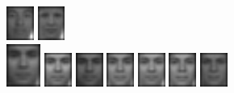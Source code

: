 \begin{figure}[hbt]
  \includegraphics[width=0.08\textwidth]{../results/L_rez/incorrect90/1/9.jpg}
  \includegraphics[width=0.08\textwidth]{../results/L_rez/incorrect90/1/10.jpg} \\
  \vspace{4pt}
  \includegraphics[width=0.1\textwidth]{../results/L_rez/incorrect90/2/testImg.jpg} \vline
  \hspace{2pt}
  \includegraphics[width=0.08\textwidth]{../results/L_rez/incorrect90/2/1.jpg}
  \includegraphics[width=0.08\textwidth]{../results/L_rez/incorrect90/2/2.jpg}
  \includegraphics[width=0.08\textwidth]{../results/L_rez/incorrect90/2/3.jpg}
  \includegraphics[width=0.08\textwidth]{../results/L_rez/incorrect90/2/4.jpg}
  \includegraphics[width=0.08\textwidth]{../results/L_rez/incorrect90/2/5.jpg}
  \includegraphics[width=0.08\textwidth]{../results/L_rez/incorrect90/2/6.jpg}

\end{figure}
